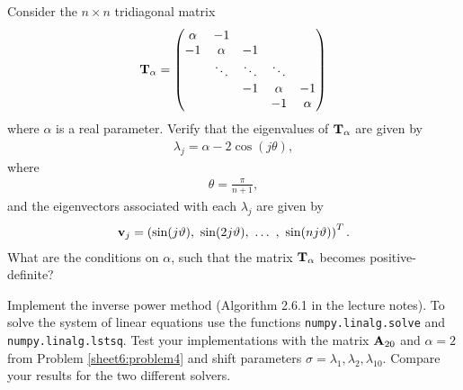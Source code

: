 \begin{Sheet}
	\begin{Problem}
		\label{sheet6:problem4}
		Consider the $n\times n$ tridiagonal matrix
		\begin{gather*}
		\mathbf T_{\alpha} =
		\begin{pmatrix}
		\alpha &     -1 &        &        & \\
		-1 & \alpha &     -1 &        & \\
		& \ddots & \ddots & \ddots & \\
		&        &     -1 & \alpha &     -1 \\
		&        &        &     -1 & \alpha
		\end{pmatrix}
		\end{gather*}
		where $\alpha$ is a real parameter. Verify that the eigenvalues of
		$\mathbf T_{\alpha}$ are given by
		\begin{gather*}
		\lambda_j = \alpha - 2\cos(j\theta),
		\end{gather*}
		where
		\begin{gather*}
		\theta = \frac\pi{n+1},
		\end{gather*}
		and the eigenvectors associated with each $\lambda_j$ are given by
		\begin{gather*}
		\mathbf v_j = \left(
		\sin(j\vartheta),\ \sin(2j\vartheta),\ \ldots\ ,\ \sin(nj\vartheta)
		\right)^T.
		\end{gather*}
		What are the conditions on $\alpha$, such that the matrix
		$\mathbf T_{\alpha}$ becomes positive-definite?
	\end{Problem}

	\begin{Problem}
		Implement the inverse power method (Algorithm 2.6.1 in the lecture notes).
        To solve the system of linear equations use the functions \texttt{numpy.linalg.solve} and \texttt{numpy.linalg.lstsq}.
        Test your implementations with the matrix $\mathbf A_{20}$ and $\alpha=2$ from Problem \ref{sheet6:problem4} and shift parameters $\sigma=\lambda_1,\lambda_2,\lambda_{10}$.
        Compare your results for the two different solvers.
	\end{Problem}

\end{Sheet}


